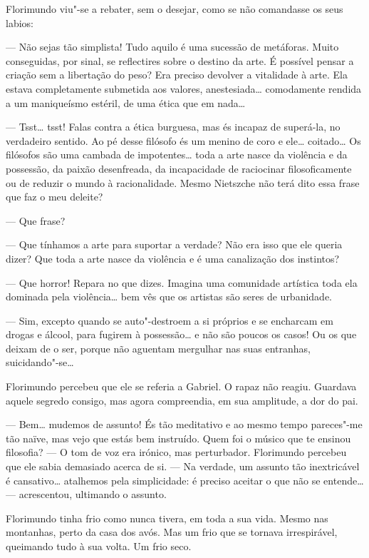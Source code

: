 Florimundo viu"-se a rebater, sem o desejar, como se não comandasse os
seus labios:

--- Não sejas tão simplista! Tudo aquilo é uma sucessão de metáforas.
Muito conseguidas, por sinal, se reflectires sobre o destino da arte. É
possível pensar a criação sem a libertação do peso? Era preciso devolver
a vitalidade à arte. Ela estava completamente submetida aos valores,
anestesiada\ldots{} comodamente rendida a um maniqueísmo estéril, de uma
ética que em nada\ldots{}

--- Tsst\ldots{} tsst! Falas contra a ética burguesa, mas és incapaz de
superá-la, no verdadeiro sentido. Ao pé desse filósofo és um menino de
coro e ele\ldots{} coitado\ldots{} Os filósofos são uma cambada de
impotentes\ldots{} toda a arte nasce da violência e da possessão, da paixão
desenfreada, da incapacidade de raciocinar filosoficamente ou de reduzir
o mundo à racionalidade. Mesmo Nietszche não terá dito essa frase que
faz o meu deleite?

--- Que frase?

--- Que tínhamos a arte para suportar a verdade? Não era isso que ele
queria dizer? Que toda a arte nasce da violência e é uma canalização dos
instintos?

--- Que horror! Repara no que dizes. Imagina uma comunidade artística toda
ela dominada pela violência\ldots{} bem vês que os artistas são seres de
urbanidade.

--- Sim, excepto quando se auto"-destroem a si próprios e se encharcam em
drogas e álcool, para fugirem à possessão\ldots{} e não são poucos os casos!
Ou os que deixam de o ser, porque não aguentam mergulhar nas suas
entranhas, suicidando"-se\ldots{}

Florimundo percebeu que ele se referia a Gabriel. O rapaz não reagiu.
Guardava aquele segredo consigo, mas agora compreendia, em sua
amplitude, a dor do pai.

--- Bem\ldots{} mudemos de assunto! És tão meditativo e ao mesmo tempo
pareces"-me tão naïve, mas vejo que estás bem instruído. Quem foi o
músico que te ensinou filosofia? --- O tom de voz era irónico, mas
perturbador. Florimundo percebeu que ele sabia demasiado acerca de si. ---
Na verdade, um assunto tão inextricável é cansativo\ldots{} atalhemos pela
simplicidade: é preciso aceitar o que não se entende\ldots{} --- acrescentou,
ultimando o assunto.

Florimundo tinha frio como nunca tivera, em toda a sua vida. Mesmo nas
montanhas, perto da casa dos avós. Mas um frio que se tornava
irrespirável, queimando tudo à sua volta. Um frio seco.

